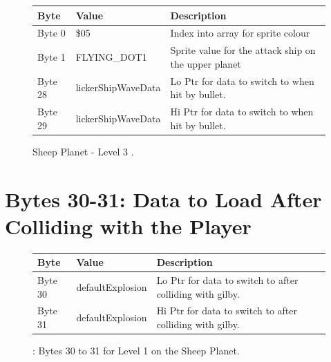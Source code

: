 \begin{figure}[H]
  {
  \setlength{\tabcolsep}{3.0pt}
  \setlength\cmidrulewidth{\heavyrulewidth} %
  \begin{adjustbox}{width=12cm}

\begin{tabular}{lll}
\toprule
 Byte    & Value                     & Description                                                        \\
\midrule
 Byte 0  & \$05                       & Index into array for sprite colour                                  \\
 Byte 1  & FLYING\_DOT1               & Sprite value for the attack ship on the upper planet\index{planet}               \\
 Byte 28 & lickerShipWaveData\index{lickerShipWaveData}         & Lo Ptr for data to switch to when hit by bullet.                                    \\
 Byte 29 & lickerShipWaveData\index{lickerShipWaveData}         & Hi Ptr for data to switch to when hit by bullet.                                    \\
\bottomrule
\end{tabular}

  \end{adjustbox}

  }\caption{Sheep Planet - Level 3
.}
\end{figure}

\section{Bytes 30-31: Data to Load After Colliding with the Player}
\begin{figure}[H]

  {
    \setlength{\tabcolsep}{3.0pt}
    \setlength\cmidrulewidth{\heavyrulewidth} %
    \begin{adjustbox}{width=12cm}

      \begin{tabular}{lll}
        \toprule
        Byte    & Value                     & Description                                                        \\
        \midrule
 Byte 30 & defaultExplosion\index{defaultExplosion}          & Lo Ptr for data to switch to after colliding\index{colliding} with gilby.                \\
 Byte 31 & defaultExplosion\index{defaultExplosion}          & Hi Ptr for data to switch to after colliding\index{colliding} with gilby.                \\
        \bottomrule
      \end{tabular}
    \end{adjustbox}
  }\caption{: Bytes 30 to 31 for Level 1 on the Sheep Planet.}
\end{figure}

